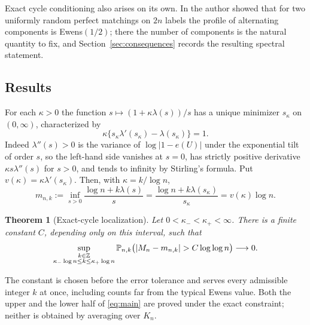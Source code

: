 \documentclass[11pt]{article}
\newtheorem{theorem}{Theorem}[section]
\theoremstyle{definition}\newtheorem{definition}[theorem]{Definition}
\theoremstyle{remark}\newtheorem{remark}[theorem]{Remark}
\numberwithin{equation}{section}\allowdisplaybreaks
\begin{document}
Exact cycle conditioning also arises on its own. In \cite{Lu} the author
showed that for two uniformly random perfect matchings on $2n$ labels
the profile of alternating components is Ewens$(1/2)$; there the number
of components is the natural quantity to fix, and
Section~\ref{sec:consequences} records the resulting spectral statement.

\subsection{Results}\label{subsec:results}

For each $\kappa>0$ the function $s\mapsto(1+\kappa\lambda(s))/s$ has a
unique minimizer $s_\kappa$ on $(0,\infty)$, characterized by
\begin{equation}\label{eq:critical}
 \kappa\{s_\kappa\lambda'(s_\kappa)-\lambda(s_\kappa)\}=1.
\end{equation}
Indeed $\lambda''(s)>0$ is the variance of $\log|1-e(U)|$ under the
exponential tilt of order $s$, so the left-hand side vanishes at $s=0$,
has strictly positive derivative $\kappa s\lambda''(s)$ for $s>0$, and
tends to infinity by Stirling's formula. Put
$v(\kappa)=\kappa\lambda'(s_\kappa)$. Then, with $\kappa=k/\log n$,
\begin{equation}\label{eq:center}
 m_{n,k}:=\inf_{s>0}\frac{\log n+k\lambda(s)}{s}
        =\frac{\log n+k\lambda(s_\kappa)}{s_\kappa}
        =v(\kappa)\log n.
\end{equation}

\begin{theorem}[Exact-cycle localization]\label{thm:main}
Let $0<\kappa_-<\kappa_+<\infty$. There is a finite constant $C$,
depending only on this interval, such that
\begin{equation}\label{eq:main}
 \sup_{\substack{k\in\Z\\\kappa_-\log n\le k\le\kappa_+\log n}}
 \Pp_{n,k}\bigl(|M_n-m_{n,k}|>C\log\log n\bigr)\longrightarrow0.
\end{equation}
\end{theorem}

The constant is chosen before the error tolerance and serves every
admissible integer $k$ at once, including counts far from the typical
Ewens value. Both the upper and the lower half of \eqref{eq:main} are
proved under the exact constraint; neither is obtained by averaging over
$K_n$.
\end{document}
